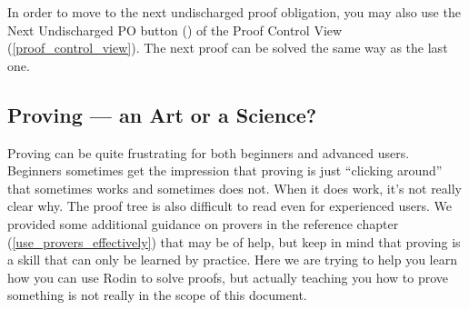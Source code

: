 
In order to move to the next undischarged proof obligation, you may also use the \textsf{Next Undischarged PO button} () of the \textsf{Proof Control View} (\ref{proof_control_view}). The next proof can be solved the same way as the last one.


\subsection{Proving --- an Art or a Science?}
\label{tut_proving_an_art_or_a_science}

Proving can be quite frustrating for both beginners and advanced users.  Beginners sometimes get the impression that proving is just ``clicking around'' that sometimes works and sometimes does not.  When it does work, it's not really clear why. The proof tree is also difficult to read even for experienced users.  We provided some additional guidance on provers in the reference chapter (\ref{use_provers_effectively}) that may be of help, but keep in mind that proving is a skill that can only be learned by practice. Here we are trying to help you learn how you can use Rodin to solve proofs, but actually teaching you how to prove something is not really in the scope of this document.



